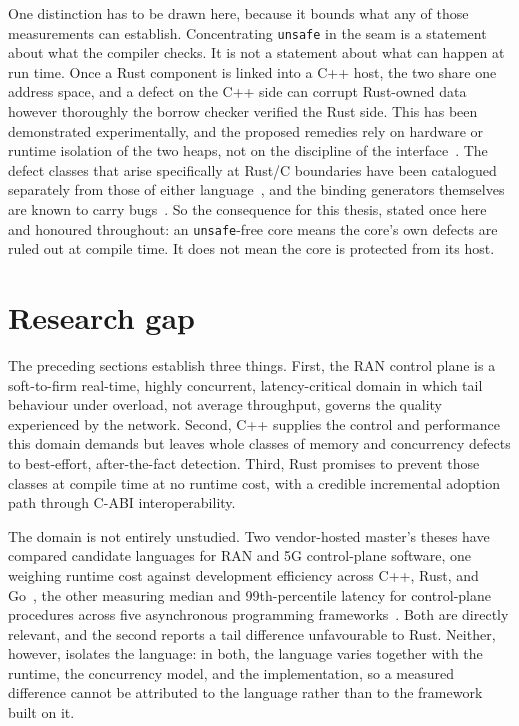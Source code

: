 \documentclass[english,twoside,openright,a4paper,censored,csm,software-track-2020]{HYthesisML}
\begin{document}
One distinction has to be drawn here, because it bounds what any of those measurements can
establish. Concentrating \texttt{unsafe} in the seam is a statement about what the compiler
checks. It is not a statement about what can happen at run time. Once a Rust component is linked
into a C++ host, the two share one address space, and a defect on the C++ side can corrupt
Rust-owned data however thoroughly the borrow checker verified the Rust side. This has been
demonstrated experimentally, and the proposed remedies rely on hardware or runtime isolation of
the two heaps, not on the discipline of the
interface~\cite{rivera2021galeed,kirth2022pkrusafe}. The defect classes that arise specifically at
Rust/C boundaries have been catalogued separately from those of either
language~\cite{li2022crosslang}, and the binding generators themselves are known to carry
bugs~\cite{cai2026interop}. So the consequence for this thesis, stated once here and honoured
throughout: an \texttt{unsafe}-free core means the core's own defects are ruled out at compile
time. It does not mean the core is protected from its host.

\section{Research gap}\label{sec:gap}
The preceding sections establish three things. First, the RAN control plane is a
soft-to-firm real-time, highly concurrent, latency-critical domain in which tail behaviour
under overload, not average throughput, governs the quality experienced by the network.
Second, C++ supplies the control and performance this domain demands but leaves whole classes
of memory and concurrency defects to best-effort, after-the-fact detection. Third, Rust
promises to prevent those classes at compile time at no runtime cost, with a credible
incremental adoption path through C-ABI interoperability.

The domain is not entirely unstudied. Two vendor-hosted master's theses have compared
candidate languages for RAN and 5G control-plane software, one weighing runtime cost against
development efficiency across C++, Rust, and Go~\cite{karlback2021ran}, the other measuring
median and 99th-percentile latency for control-plane procedures across five asynchronous
programming frameworks~\cite{arvidsson2025async}. Both are directly relevant, and the second
reports a tail difference unfavourable to Rust. Neither, however, isolates the language:
in both, the language varies together with the runtime, the concurrency model, and the
implementation, so a measured difference cannot be attributed to the language rather than to
the framework built on it.
\end{document}
